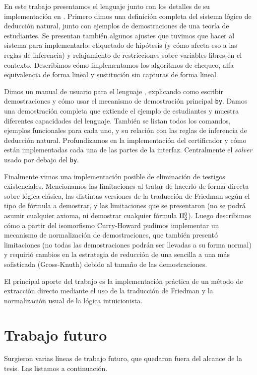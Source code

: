 En este trabajo presentamos el lenguaje \ppaLang{} junto con los detalles de su
implementación en \ppaTool{}. Primero dimos una definición completa del sistema
lógico de deducción natural, junto con ejemplos de demostraciones de una
teoría de estudiantes. Se presentan también algunos ajustes que tuvimos que
hacer al sistema para implementarlo: etiquetado de hipótesis (y cómo afecta eso
a las reglas de inferencia) y relajamiento de restricciones sobre variables
libres en el contexto. Describimos cómo implementamos los algoritmos de chequeo,
alfa equivalencia de forma lineal y sustitución sin capturas de forma lineal.

Dimos un manual de usuario para el lenguaje \ppaLang{}, explicando como
escribir demostraciones y cómo usar el mecanismo de demostración principal
\lstinline{by}. Damos una demostración completa que extiende el ejemplo de
estudiantes y muestra diferentes capacidades del lenguaje. También se listan
todos los comandos, ejemplos funcionales para cada uno, y su relación con las
reglas de inferencia de deducción natural. Profundizamos en la implementación
del certificador y cómo están implementadas cada una de las partes de la
interfaz. Centralmente el \textit{solver} usado por debajo del \lstinline{by}.

Finalmente vimos una implementación posible de eliminación de testigos
existenciales. Mencionamos las limitaciones al tratar de hacerlo de forma
directa sobre lógica clásica, las distintas versiones de la traducción de
Friedman según el tipo de fórmula a demostrar, y las limitaciones que se
presentaron (no se podrá asumir cualquier axioma, ni demostrar cualquier fórmula
$\Pi^0_{2}$). Luego describimos cómo a partir del isomorfismo Curry-Howard
pudimos implementar un mecanismo de normalización de demostraciones, que también
presentó limitaciones (no todas las demostraciones podrán ser llevadas a su
forma normal) y requirió cambios en la estrategia de reducción de una sencilla a
una más sofisticada (Gross-Knuth) debido al tamaño de las demostraciones.

El principal aporte del trabajo es la implementación práctica de un método de
extracción directo mediante el uso de la traducción de Friedman y la
normalización usual de la lógica intuicionista.

\section{Trabajo futuro}

Surgieron varias líneas de trabajo futuro, que quedaron fuera del alcance de la
tesis. Las listamos a continuación.

